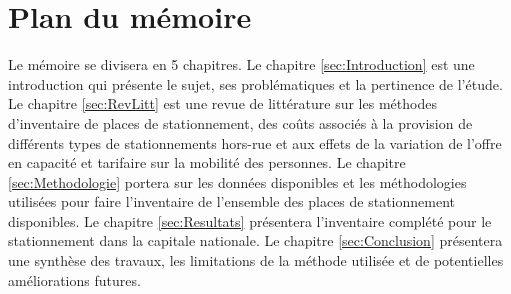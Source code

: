 \section{Plan du mémoire}  %

Le mémoire se divisera en 5 chapitres. Le chapitre \ref{sec:Introduction} est une introduction qui présente le sujet, ses problématiques et la pertinence de l'étude. Le chapitre \ref{sec:RevLitt} est une revue de littérature sur les méthodes d'inventaire de places de stationnement, des coûts associés à la provision de différents types de stationnements hors-rue et aux effets de la variation de l'offre en capacité et tarifaire sur la mobilité des personnes. Le chapitre \ref{sec:Methodologie} portera sur les données disponibles et les méthodologies utilisées pour faire l'inventaire de l'ensemble des places de stationnement disponibles. Le chapitre \ref{sec:Resultats} présentera l'inventaire complété pour le stationnement dans la capitale nationale. Le chapitre \ref{sec:Conclusion} présentera une synthèse des travaux, les limitations de la méthode utilisée et de potentielles améliorations futures.

\clearpage
